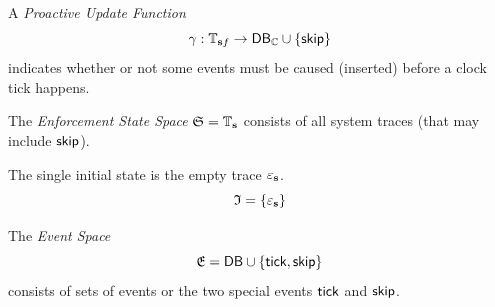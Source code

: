 \begin{definition}
    \label{def:proactive-update-function}
    A \emph{Proactive Update Function}
    \begin{equation*}
       \gamma :
       \mathbb{T}_{\mathbf{s} f}
       \to
       \mathsf{DB}_{\mathbb{C}} \cup \{ \mathsf{skip} \}
    \end{equation*}
    indicates whether or not some events must be caused (inserted)
    before a clock tick happens.
\end{definition}

\begin{definition}
    \label{def:enf-state-space}
    The \emph{Enforcement State Space} $\mathfrak{S} = \mathbb{T}_{\mathbf{s}}$
    consists of all system traces (that may include $\mathsf{skip}$).
\end{definition}

\begin{definition}
    \label{def:enf-initial-states}
    The single initial state is the empty trace $\varepsilon_{\mathbf{s}}$.
    $$\mathfrak{I} = \lbrace \varepsilon_{\mathbf{s}} \rbrace$$
\end{definition}

\begin{definition}
    \label{def:enf-event-space}
    The \emph{Event Space}
    \begin{equation*}
        \mathfrak{E}=\mathsf{DB} \cup \lbrace \mathsf{tick}, \mathsf{skip} \rbrace
    \end{equation*}
    consists of sets of events or the two special events $\mathsf{tick}$ and $\mathsf{skip}$.
\end{definition}


